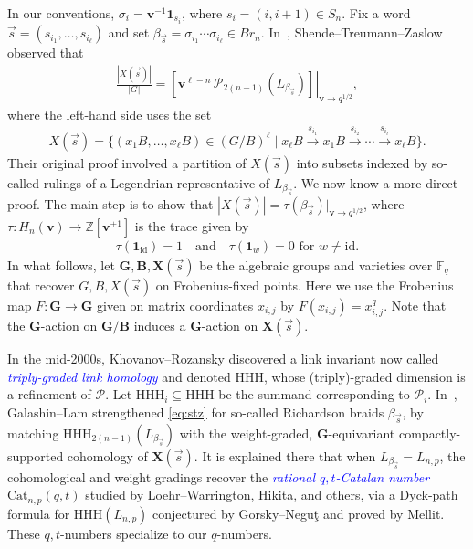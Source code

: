 \documentclass[submission]{FPSAC2025}
\newcommand{\dfemph}[1]{\textcolor{blue}{\emph{#1}}}
\newcommand{\id}{\mathrm{id}}
\newcommand{\m}{p}
\newcommand{\x}{\mathbf{v}}
\newcommand{\Br}{\mathit{Br}}
\newcommand{\HOMFLYPT}{\mathcal{P}}
\newcommand{\HHH}{\mathrm{HHH}}
\newcommand{\Cat}{\mathrm{Cat}}
\begin{document}
In our conventions, $\sigma_i = \x^{-1}\mathbf{1}_{s_i}$, where $s_i = (i, i + 1) \in S_n$.
Fix a word $\vec{s} = (s_{i_1}, \ldots, s_{i_\ell})$ and set $\beta_{\vec{s}} = \sigma_{i_1} \cdots \sigma_{i_\ell} \in \Br_n$.
In~\cite{stz}, Shende--Treumann--Zaslow observed that
\begin{align}\label{eq:stz}
\frac{|X(\vec{s})|}{|G|} = \left.\left[\x^{\ell - n}\,\HOMFLYPT_{2(n - 1)}(L_{\beta_{\vec{s}}})\right]\right|_{\x \to q^{1/2}},
\end{align}
where the left-hand side uses the set
\begin{align}
X(\vec{s}) = \{(x_1B, \ldots, x_\ell B) \in (G/B)^\ell \mid x_\ell B \xrightarrow{s_{i_1}} x_1 B \xrightarrow{s_{i_2}} \cdots \xrightarrow{s_{i_\ell}} x_\ell B\}.
\end{align}
Their original proof involved a partition of $X(\vec{s})$ into subsets indexed by so-called rulings of a Legendrian representative of $L_{\beta_{\vec{s}}}$.
We now know a more direct proof.
The main step is to show that $|X(\vec{s})| = \tau(\beta_{\vec{s}})|_{\x \to q^{1/2}}$, where $\tau : H_n(\x) \to \mathbb{Z}[\x^{\pm 1}]$ is the trace given by 
\begin{align}\label{eq:tau}
\tau(\mathbf{1}_\id) = 1
	\quad\text{and}\quad
\tau(\mathbf{1}_w)
	= \text{$0$ for $w \neq \id$}.
\end{align}
In what follows, let $\mathbf{G}, \mathbf{B}, \mathbf{X}(\vec{s})$ be the algebraic groups and varieties over $\bar{\mathbb{F}}_q$ that recover $G, B, X(\vec{s})$ on Frobenius-fixed points.
Here we use the Frobenius map $F : \mathbf{G} \to \mathbf{G}$ given on matrix coordinates $x_{i,j}$ by $F(x_{i,j}) = x_{i,j}^q$.
Note that the $\mathbf{G}$-action on $\mathbf{G}/\mathbf{B}$ induces a $\mathbf{G}$-action on $\mathbf{X}(\vec{s})$.

In the mid-2000s, Khovanov--Rozansky discovered a link invariant now called \dfemph{triply-graded link homology} and denoted $\HHH$, whose (triply)-graded dimension is a refinement of $\HOMFLYPT$.
Let $\HHH_i \subseteq \HHH$ be the summand corresponding to $\HOMFLYPT_i$.
In~\cite{gl}, Galashin--Lam strengthened \eqref{eq:stz} for so-called Richardson braids $\beta_{\vec{s}}$, by matching $\HHH_{2(n - 1)}(L_{\beta_{\vec{s}}})$ with the weight-graded, $\mathbf{G}$-equivariant compactly-supported cohomology of $\mathbf{X}(\vec{s})$.
It is explained there that when $L_{\beta_{\vec{s}}} = L_{n, \m}$, the cohomological and weight gradings recover the \dfemph{rational $q, t$-Catalan number} $\Cat_{n, \m}(q, t)$ studied by Loehr--Warrington, Hikita, and others, via a Dyck-path formula for $\HHH(L_{n, \m})$ conjectured by Gorsky--Negu\c{t} 
and proved by Mellit.
These $q, t$-numbers specialize to our $q$-numbers.
\end{document}
